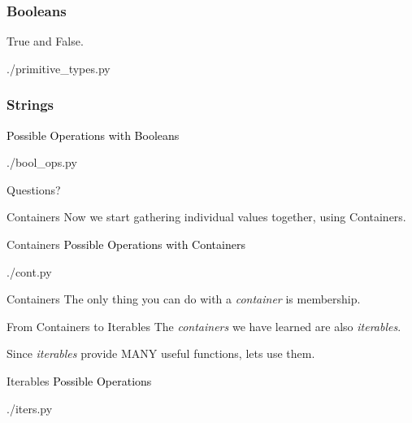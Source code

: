 \documentclass{beamer}
\begin{document}
\begin{frame}
  \frametitle{Booleans}
  True and False.
  \begin{lstinputlisting}[firstline=14, lastline=15]
    {./primitive_types.py}
  \end{lstinputlisting}
\end{frame}

\begin{frame}
  \frametitle{Strings}
  \textcolor{black}{\large{Possible Operations with Booleans}}
  \begin{lstinputlisting}
    {./bool_ops.py}
  \end{lstinputlisting}
\end{frame}

\begin{frame}[plain, c]
  \begin{center}
    Questions?
  \end{center}
\end{frame}

\begin{frame}{Containers}
  Now we start gathering individual values together,
  using Containers.
\end{frame}

\begin{frame}{Containers}
  \textcolor{black}{\large{Possible Operations with Containers}}
  \begin{lstinputlisting}
    {./cont.py}
  \end{lstinputlisting}
\end{frame}

\begin{frame}{Containers}
  The only thing you can do with a \textit{container} is membership.
\end{frame}

\begin{frame}{From Containers to Iterables}
  The \textit{containers} we have learned are also \textit{iterables}.

  Since \textit{iterables} provide MANY useful functions, lets use them.
\end{frame}


\begin{frame}{Iterables}
  \textcolor{black}{\large{Possible Operations}}
  \begin{lstinputlisting}[firstline=4, lastline=19]
    {./iters.py}
  \end{lstinputlisting}
\end{frame}
\end{document}
